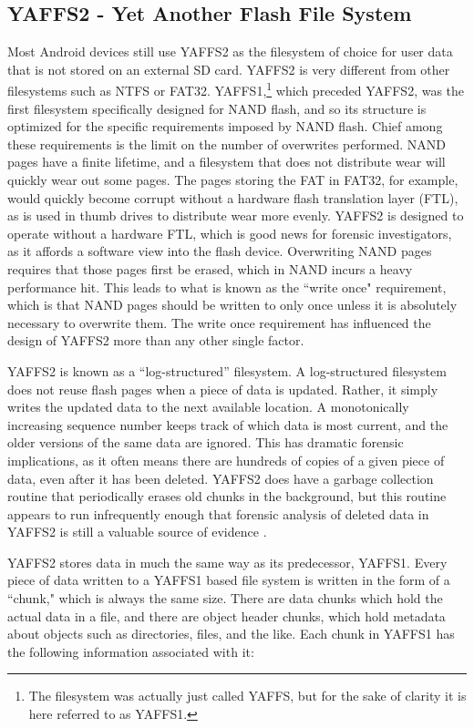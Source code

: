 \subsection{YAFFS2 - Yet Another Flash File System} Most Android devices still use YAFFS2 as the filesystem of choice for user data
that is not stored on an external SD card.  YAFFS2 is very different from other filesystems such as NTFS or FAT32.
YAFFS1,\footnote{The filesystem was actually just called YAFFS, but for the sake of clarity it is here referred to as YAFFS1.} which
preceded YAFFS2,  was the first filesystem specifically designed for NAND flash, and so its structure is optimized for the specific
requirements imposed by NAND flash.  Chief among these requirements is the limit on the number of overwrites performed.  NAND pages
have a finite lifetime, and a filesystem that does not distribute wear will quickly wear out some pages.  The pages storing the FAT
in FAT32, for example, would quickly become corrupt without a hardware flash translation layer (FTL), as is used in thumb drives to
distribute wear more evenly.  YAFFS2 is designed to operate without a hardware FTL, which is good news for forensic investigators,
as it affords a software view into the flash device.  Overwriting NAND pages requires that those pages first be erased, which in
NAND incurs a heavy performance hit.  This leads to what is known as the ``write once" requirement, which is that NAND pages should
be written to only once unless it is absolutely necessary to overwrite them. The write once requirement has influenced the design of
YAFFS2 more than any other single factor.

YAFFS2 is known as a ``log-structured'' filesystem.  A log-structured filesystem does not reuse flash pages when a piece of data is
updated.  Rather, it simply writes the updated data to the next available location.  A monotonically increasing sequence number
keeps track of which data is most current, and the older versions of the same data are ignored.  This has dramatic forensic
implications, as it often means there are hundreds of copies of a given piece of data, even after it has been deleted.  YAFFS2 does
have a garbage collection routine that periodically erases old chunks in the background, but this routine appears to run
infrequently enough that forensic analysis of deleted data in YAFFS2 is still a valuable source of evidence \cite{naval}. 

YAFFS2 stores data in much the same way as its predecessor, YAFFS1.  Every piece of data written to a YAFFS1 based file system is
written in the form of a ``chunk," which is always the same size.  There are data chunks which hold the actual data in a file, and
there are object header chunks, which hold metadata about objects such as directories, files, and the like.  Each chunk in YAFFS1
has the following information associated with it:

